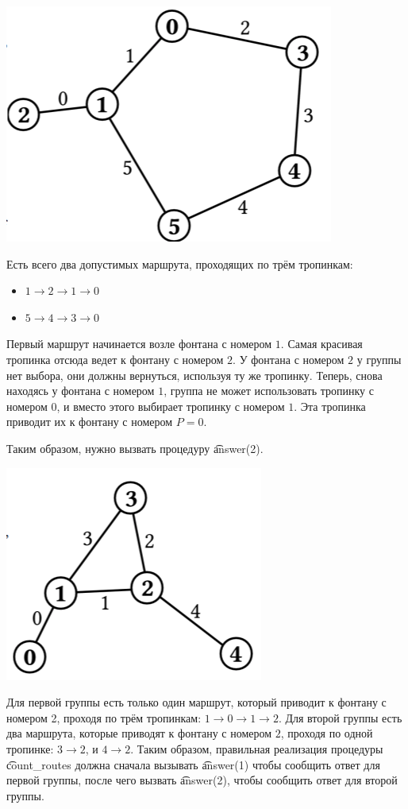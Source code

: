 \includegraphics{garden1.png}

Есть всего два допустимых маршрута, проходящих по трём тропинкам: 
\begin{itemize}
\item $1 \rightarrow 2 \rightarrow 1 \rightarrow 0$ 
\item $5 \rightarrow 4 \rightarrow 3 \rightarrow 0$
\end{itemize}

Первый маршрут начинается возле фонтана с номером $1$. Самая красивая тропинка отсюда ведет к фонтану с номером $2$. У фонтана с номером $2$ у группы нет выбора, они должны вернуться, используя ту же тропинку. Теперь, снова находясь у фонтана с номером $1$, группа не может использовать тропинку с номером $0$, и вместо этого выбирает тропинку с номером $1$. Эта тропинка приводит их к фонтану с номером $P=0$.

Таким образом, нужно вызвать процедуру \t{answer(2)}.

\includegraphics{garden2.png}

Для первой группы есть только один маршрут, который приводит к фонтану с номером 2, проходя по трём тропинкам: $1 \rightarrow 0 \rightarrow 1 \rightarrow 2$. Для второй группы есть два маршрута, которые приводят к фонтану с номером $2$, проходя по одной тропинке: $3 \rightarrow 2$, и $4 \rightarrow 2$. Таким образом, правильная реализация процедуры \t{count\_routes} должна сначала вызывать \t{answer(1)} чтобы сообщить ответ для первой группы, после чего вызвать \t{answer(2)}, чтобы сообщить ответ для второй группы.
